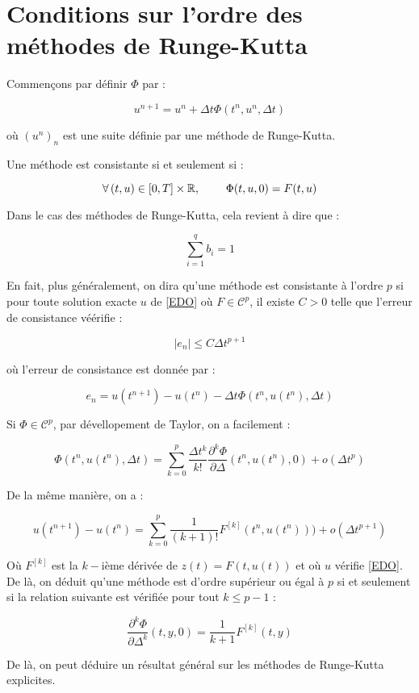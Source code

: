 \documentclass[10pt,a4paper]{amsart}
\begin{document}
\section{Conditions sur l'ordre des méthodes de Runge-Kutta}

Commençons par définir $\Phi$ par :

$$u^{n+1} = u^n  + \Delta t \Phi(t^n,u^n,\Delta t)$$

où $(u^n)_n$ est une suite définie par une méthode de Runge-Kutta.

Une méthode est consistante si et seulement si :

$$\forall \left( t, u \right) \in \left[ 0, T \right] \times \mathbb{R}, \hspace{0.8cm} \Phi(t,u,0) = F(t, u)$$

Dans le cas des méthodes de Runge-Kutta, cela revient à dire que :

$$\sum_{i=1}^q b_i = 1$$

En fait, plus généralement, on dira qu'une méthode est consistante à l'ordre $p$ si pour toute solution exacte $u$ de \eqref{EDO} où $F \in \mathcal{C}^p$, il existe $C > 0$ telle que l'erreur de consistance véérifie :

$$|e_n| \leq C \Delta t^{p+1}$$

où l'erreur de consistance est donnée par :

$$e_n = u(t^{n+1}) - u(t^n) - \Delta t \Phi(t^n,u(t^n),\Delta t)$$

Si $\Phi \in \mathcal{C}^p$, par dévellopement de Taylor, on a facilement :

$$\Phi(t^n,u(t^n),\Delta t) = \sum_{k=0}^{p} \dfrac{\Delta t^k}{k!} \dfrac{\partial^k \Phi}{\partial \Delta} (t^n, u(t^n), 0) + o \left( \Delta t^p  \right)$$

De la même manière, on a :

$$u(t^{n+1}) - u(t^n) = \sum_{k=0}^{p} \dfrac{1}{(k+1)!} F^{[k]}(t^n, u(t^n))) + o \left( \Delta t^{p+1}  \right)$$

Où $F^{[k]}$ est la $k-$ième dérivée de $z(t)=F(t, u(t))$ et où $u$ vérifie \eqref{EDO}. De là, on déduit qu'une méthode est d'ordre supérieur ou égal à $p$ si et seulement si la relation suivante est vérifiée pour tout $k \leq p-1$ :

\begin{equation}
\dfrac{\partial^k \Phi}{\partial \Delta^k} (t, y, 0) = \dfrac{1}{k+1}F^{[k]}(t,y)
\end{equation}

De là, on peut déduire un résultat général sur les méthodes de Runge-Kutta explicites.
\end{document}
